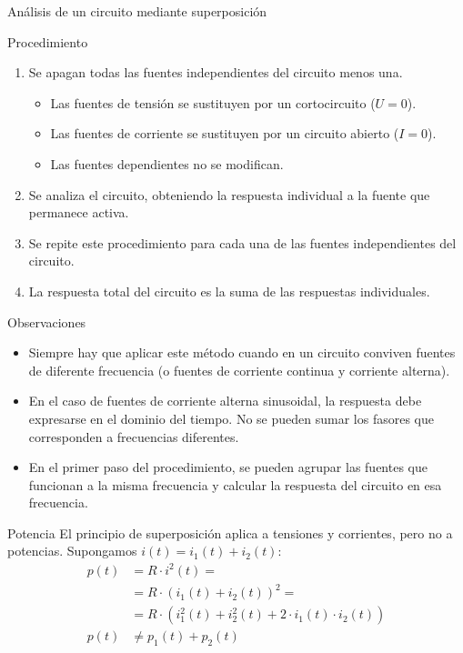 \documentclass[aspectratio=169, usenames,svgnames,dvipsnames]{beamer}
\begin{document}
\begin{frame}[label={sec:org2f5d2d3}]{Análisis de un circuito mediante superposición}
\begin{block}{Procedimiento}
\begin{enumerate}
\item Se apagan todas las fuentes \alert{independientes} del circuito menos una.
\begin{itemize}
\item Las fuentes de tensión se sustituyen por un cortocircuito (\(U = 0\)).
\item Las fuentes de corriente se sustituyen por un circuito abierto (\(I = 0\)).
\item Las fuentes \alert{dependientes} \alert{no} se modifican.
\end{itemize}
\item Se analiza el circuito, obteniendo la respuesta individual a la fuente que permanece activa.
\item Se repite este procedimiento para cada una de las fuentes \alert{independientes} del circuito.
\item La respuesta total del circuito es la suma de las respuestas individuales.
\end{enumerate}
\end{block}
\end{frame}
\begin{frame}[label={sec:org886d7e8}]{Observaciones}
\begin{itemize}
\item \alert{Siempre} hay que aplicar este método cuando en un circuito conviven fuentes de \alert{diferente frecuencia} (o fuentes de corriente continua y corriente alterna).
\item En el caso de fuentes de corriente alterna \alert{sinusoidal}, la respuesta debe expresarse en el \alert{dominio del tiempo}. \alert{No} se pueden \alert{sumar} los \alert{fasores} que corresponden a \alert{frecuencias diferentes}.
\item En el primer paso del procedimiento, se pueden agrupar las fuentes que funcionan a la misma frecuencia y calcular la respuesta del circuito en esa frecuencia.
\end{itemize}
\end{frame}

\begin{frame}[label={sec:org5409c67}]{Potencia}
El principio de superposición aplica a tensiones y corrientes, pero \alert{no} a potencias. Supongamos \(i(t) = i_1(t) + i_2(t)\):
\begin{align*}
  p(t) &= R \cdot i^2(t) =\\
       &= R \cdot (i_1(t) + i_2(t))^2 =\\
       &=R \cdot (i_1^2(t) + i_2^2(t) + 2\cdot i_1(t) \cdot i_2(t))\\
  p(t) &\neq p_1(t) + p_2(t)
\end{align*}
\end{frame}
\end{document}
